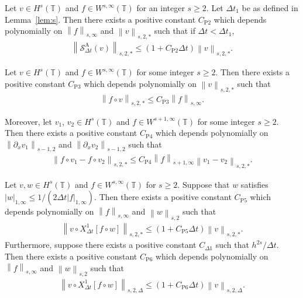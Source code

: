 \documentclass[10pt,a4paper]{amsart}
\def\norm#1#2{\left\|#2\right\|_{#1}}
\def\snorm#1#2{\left|#2\right|_{#1}}
\begin{document}
\begin{lemma} \label{lem:s2} 
  Let $ v \in H^s (\mathbb{T}) $ and $ f \in W^{s, \infty} (\mathbb{T}) $ for an integer $ s \geq 2 $. Let $ \Delta t_1 $ be as defined in Lemma~\ref{lem:s}. Then there exists a positive constant $ C_{\mathrm{P}2} $ which depends polynomially on $ \norm{s, \infty}{f} $ and $ \norm{s,2,\ast}{v} $ such that if $ \Delta t < \Delta t_1 $, 
  \begin{align} 
    \norm{s,2,\ast}{\mathcal{S}_{\Delta t}^{\mathrm{A}} (v)} \leq \left(1 + C_{\mathrm{P}2} \Delta t \right) \norm{s,2,\ast} {v}. \label{a2} 
  \end{align} 
\end{lemma} 

\begin{lemma}\label{lem:a1} 
  Let $ v \in H^s (\mathbb{T}) $ and $ f \in W^{s, \infty} (\mathbb{T}) $ for some integer $ s \geq 2 $. Then there exists a positive constant $ C_{\mathrm{P}3} $ which depends polynomially on $ \norm{s, 2, \ast}{v} $ such that 
  \begin{align} 
    \norm{s, 2, \ast}{f \circ v} \leq C_{\mathrm{P}3} \norm{s, \infty}{f}. \label{ap1} 
  \end{align} 
  
  Moreover, let $ v_1 $, $v_2 \in H^s (\mathbb{T}) $ and $ f \in W^{s + 1, \infty} (\mathbb{T}) $ for some integer $ s \geq 2 $. Then there exists a positive constant $ C_{\mathrm{P}4} $ which depends polynomially on $ \norm{s - 1, 2}{\partial_x v_1} $ and $ \norm{s - 1, 2} {\partial_x v_2} $ such that 
  \begin{align} 
    \norm{s, 2, \ast}{f \circ v_1 - f \circ v_2} \leq C_{\mathrm{P}4} \norm{s + 1, \infty}{f} \norm{s, 2, \ast}{v_1 - v_2}. \label{ap2} 
  \end{align} 
\end{lemma}

\begin{lemma}\label{lem:c} 
  Let $ v, w \in H^s (\mathbb{T}) $ and $ f \in W^{s,\infty} (\mathbb{T}) $ for $ s \geq 2 $. 
  Suppose that $ w $ satisfies $ \snorm{1, \infty}{w} \leq 1 / (2 \Delta t \snorm{1, \infty}{f}) $. 
  Then there exists a positive constant $ C_{\mathrm{P}5} $ which depends polynomially on $ \norm{s, \infty}{f} $ and $ \norm{s, 2}{w} $ such that 
  \begin{align} 
    \norm{s, 2, \ast}{v \circ {X_{\Delta t}^1}[f \circ w]} \leq (1 + C_{\mathrm{P}5} \Delta t) \norm{s, 2, \ast}{v}. \label{c2} 
  \end{align} 
  Furthermore, suppose there exists a positive constant $ C_{\Delta 1} $ such that $ h^{2s} / \Delta t $. Then there exists a positive constant $ C_{\mathrm{P}6} $ which depends polynomially on $ \norm{s, \infty}{f} $ and $ \norm{s, 2}{w} $ such that 
  \begin{align} 
    \norm{s, 2, \Delta}{v \circ {X_{\Delta t}^1}[f \circ w]} \leq (1 + C_{\mathrm{P}6} \Delta t) \norm{s, 2, \Delta}{v}. \label{c2-2} 
  \end{align} 
\end{lemma} 
\end{document}
